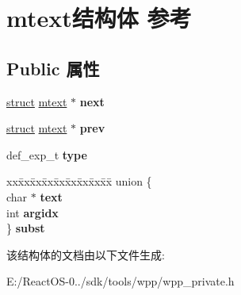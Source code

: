 \hypertarget{structmtext}{}\section{mtext结构体 参考}
\label{structmtext}
\subsection*{Public 属性}
\begin{DoxyCompactItemize}
\item 
\mbox{\label{structmtext_acc5e422a1f7e2aea93eb30d6eb34d91b}} 
\hyperlink{interfacestruct}{struct} \hyperlink{structmtext}{mtext} $\ast$ {\bfseries next}
\item 
\mbox{\label{structmtext_a92058e49c1c67cb1b7fd3e1d0148f668}} 
\hyperlink{interfacestruct}{struct} \hyperlink{structmtext}{mtext} $\ast$ {\bfseries prev}
\item 
\mbox{\label{structmtext_a3ca6c2047ebd9247ff941b7a48d5d2d7}} 
def\+\_\+exp\+\_\+t {\bfseries type}
\item 
\mbox{\label{structmtext_ae12f93065d56025765e0edbba4e2d779}} 
\begin{tabbing}
xx\=xx\=xx\=xx\=xx\=xx\=xx\=xx\=xx\=\kill
union \{\\
\>char $\ast$ {\bfseries text}\\
\>int {\bfseries argidx}\\
\} {\bfseries subst}\\

\end{tabbing}\end{DoxyCompactItemize}


该结构体的文档由以下文件生成\+:\begin{DoxyCompactItemize}
\item 
E\+:/\+React\+O\+S-\/0../sdk/tools/wpp/wpp\+\_\+private.\+h\end{DoxyCompactItemize}

